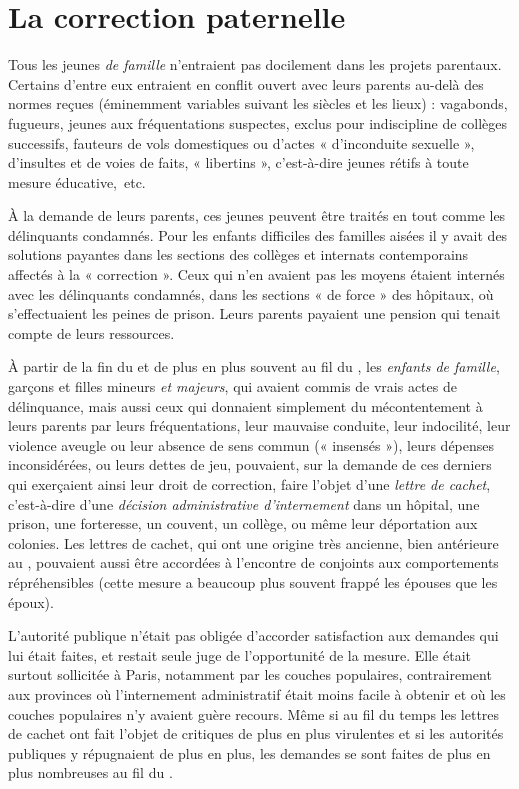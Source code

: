 \section{La correction paternelle}

 Tous les jeunes \emph{de famille} n'entraient pas docilement dans les projets parentaux. Certains d'entre eux entraient en conflit ouvert avec leurs parents au-delà des normes reçues (éminemment variables suivant les siècles et les lieux) : vagabonds, fugueurs, jeunes aux fréquentations suspectes, exclus pour indiscipline de collèges successifs, fauteurs de vols domestiques ou d'actes « d'inconduite sexuelle », d'insultes et de voies de faits, « libertins », c'est-à-dire jeunes rétifs à toute mesure éducative,~etc. 

 À la demande de leurs parents, ces jeunes peuvent être traités en tout comme les délinquants con\-dam\-nés. Pour les enfants difficiles des familles aisées il y avait des solutions payantes dans les sections des collèges et internats contemporains affectés à la « correction ». Ceux qui n'en avaient pas les moyens étaient internés avec les délinquants condamnés, dans les sections « de force » des hôpitaux, où s'effectuaient les peines de prison. Leurs parents payaient une pension qui tenait compte de leurs ressources. 

 À partir de la fin du  et de plus en plus souvent au fil du , les \emph{enfants de famille}, garçons et filles mineurs \emph{et majeurs}, qui avaient commis de vrais actes de délinquance, mais aussi ceux qui donnaient simplement du mécontentement à leurs parents par leurs fréquentations, leur mauvaise conduite, leur indocilité, leur violence aveugle ou leur absence de sens commun (« insensés »), leurs dépenses inconsidérées, ou leurs dettes de jeu, pouvaient, sur la demande de ces derniers qui exerçaient ainsi leur droit de correction, faire l'objet d'une \emph{lettre de cachet}, c'est-à-dire d'une \emph{décision administrative d'internement} dans un hôpital, une prison, une forteresse, un couvent, un collège, ou même leur déportation aux colonies. Les lettres de cachet, qui ont une origine très ancienne, bien antérieure au , pouvaient aussi être accordées à l'encontre de conjoints aux comportements répréhensibles (cette mesure a beaucoup plus souvent frappé les épouses que les époux). 

 L'autorité publique n'était pas obligée d'accorder satisfaction aux demandes qui lui était faites, et restait seule juge de l'opportunité de la mesure. Elle était surtout sollicitée à Paris, notamment par les couches populaires, contrairement aux provinces où l'internement administratif était moins facile à obtenir et où les couches populaires n'y avaient guère recours. Même si au fil du temps les lettres de cachet ont fait l'objet de critiques de plus en plus virulentes et si les autorités publiques y répugnaient de plus en plus, les demandes se sont faites de plus en plus nombreuses au fil du . 

